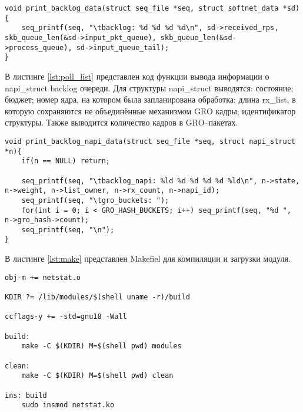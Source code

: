 \begin{center}
	\captionsetup{justification=raggedright,singlelinecheck=off}
	\begin{lstlisting}[label=lst:backlog,caption=Функция вывода информации о backlog очереди,showstringspaces=false]
void print_backlog_data(struct seq_file *seq, struct softnet_data *sd) {
	seq_printf(seq, "\tbacklog: %d %d %d %d\n", sd->received_rps, skb_queue_len(&sd->input_pkt_queue), skb_queue_len(&sd->process_queue), sd->input_queue_tail);
}
	\end{lstlisting}
\end{center}
\FloatBarrier

В листинге \ref{lst:poll_list} представлен код функции вывода информации о napi\_struct backlog очереди. Для структуры napi\_struct выводятся: состояние; бюджет; номер ядра, на котором была запланирована обработка; длина rx\_list, в которую сохраняются не объединённые механизмом GRO кадры; идентификатор структуры. Также выводится количество кадров в GRO--пакетах.

\begin{center}
	\captionsetup{justification=raggedright,singlelinecheck=off}
	\begin{lstlisting}[label=lst:poll_list,caption=Функция вывода информации о napi\_struct backlog очереди,showstringspaces=false]
void print_backlog_napi_data(struct seq_file *seq, struct napi_struct *n){
	if(n == NULL) return;
	
	seq_printf(seq, "\tbacklog_napi: %ld %d %d %d %d %ld\n", n->state, n->weight, n->list_owner, n->rx_count, n->napi_id);
	seq_printf(seq, "\tgro_buckets: ");
	for(int i = 0; i < GRO_HASH_BUCKETS; i++) seq_printf(seq, "%d ", n->gro_hash->count);
	seq_printf(seq, "\n");
}
	\end{lstlisting}
\end{center}
\FloatBarrier

В листинге \ref{lst:make} представлен Makefiel для компиляции и загрузки модуля.

\begin{center}
	\captionsetup{justification=raggedright,singlelinecheck=off}
	\begin{lstlisting}[label=lst:make,caption=Makefiel для компиляции и загрузки модуля,showstringspaces=false]
obj-m += netstat.o

KDIR ?= /lib/modules/$(shell uname -r)/build

ccflags-y += -std=gnu18 -Wall

build:
	make -C $(KDIR) M=$(shell pwd) modules

clean:
	make -C $(KDIR) M=$(shell pwd) clean

ins: build
	sudo insmod netstat.ko
	\end{lstlisting}
\end{center}
\FloatBarrier
